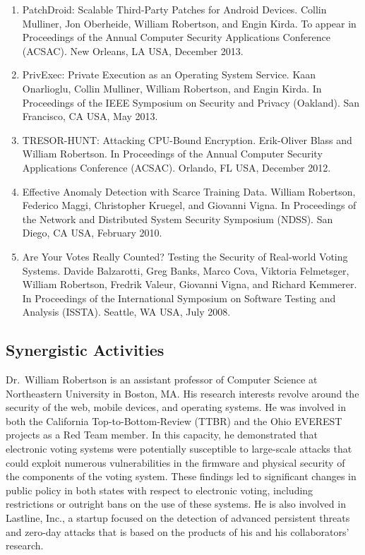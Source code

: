 \documentclass[letterpaper,11pt]{scrartcl}
\begin{document}
\begin{enumerate}
    \item PatchDroid: Scalable Third-Party Patches for Android Devices.
    Collin Mulliner, Jon Oberheide, William Robertson, and Engin Kirda.
    To appear in Proceedings of the Annual Computer Security Applications Conference (ACSAC).
    New Orleans, LA USA, December 2013.
    \item PrivExec: Private Execution as an Operating System Service.
    Kaan Onarlioglu, Collin Mulliner, William Robertson, and Engin Kirda.
    In Proceedings of the IEEE Symposium on Security and Privacy (Oakland).
    San Francisco, CA USA, May 2013.
    \item TRESOR-HUNT: Attacking CPU-Bound Encryption.
    Erik-Oliver Blass and William Robertson.
    In Proceedings of the Annual Computer Security Applications Conference (ACSAC).
    Orlando, FL USA, December 2012.
    \item Effective Anomaly Detection with Scarce Training Data.
    William Robertson, Federico Maggi, Christopher Kruegel, and Giovanni Vigna.
    In Proceedings of the Network and Distributed System Security Symposium (NDSS).
    San Diego, CA USA, February 2010.
    \item Are Your Votes Really Counted? Testing the Security of Real-world Voting Systems.
    Davide Balzarotti, Greg Banks, Marco Cova, Viktoria Felmetsger, William Robertson, Fredrik Valeur, Giovanni Vigna, and Richard Kemmerer.
    In Proceedings of the International Symposium on Software Testing and Analysis (ISSTA).
    Seattle, WA USA, July 2008.
\end{enumerate}

\subsection*{Synergistic Activities}

Dr.~William Robertson is an assistant professor of Computer Science at
Northeastern University in Boston, MA.  His research interests revolve around
the security of the web, mobile devices, and operating systems. He was
involved in both the California Top-to-Bottom-Review (TTBR) and the Ohio
EVEREST projects as a Red Team member.  In this capacity, he demonstrated that
electronic voting systems were potentially susceptible to large-scale attacks
that could exploit numerous vulnerabilities in the firmware and physical
security of the components of the voting system.  These findings led to
significant changes in public policy in both states with respect to electronic
voting, including restrictions or outright bans on the use of these systems.
He is also involved in Lastline, Inc., a startup focused on the detection of
advanced persistent threats and zero-day attacks that is based on the products
of his and his collaborators' research.
\end{document}
